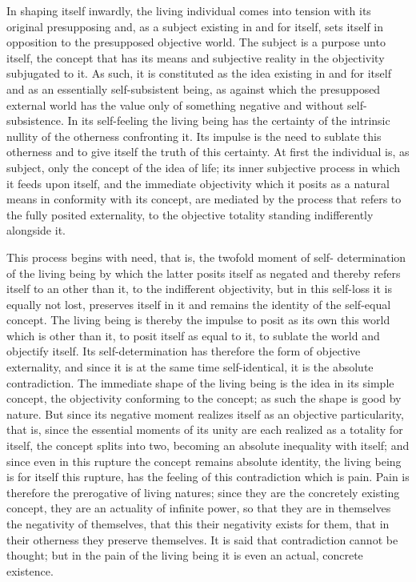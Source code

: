 In shaping itself inwardly, the living individual comes into tension with
its original presupposing and, as a subject existing in and for itself, sets
itself in opposition to the presupposed objective world. The subject is a
purpose unto itself, the concept that has its means and subjective reality
in the objectivity subjugated to it. As such, it is constituted as the idea
existing in and for itself and as an essentially self-subsistent being, as against
which the presupposed external world has the value only of something
negative and without self-subsistence. In its self-feeling the living being
has the certainty of the intrinsic nullity of the otherness confronting it. Its
impulse is the need to sublate this otherness and to give itself the truth
of this certainty. At first the individual is, as subject, only the concept
of the idea of life; its inner subjective process in which it feeds upon
itself, and the immediate objectivity which it posits as a natural means
in conformity with its concept, are mediated by the process that refers to
the fully posited externality, to the objective totality standing indifferently
alongside it.

This process begins with need, that is, the twofold moment of self-
determination of the living being by which the latter posits itself as negated
and thereby refers itself to an other than it, to the indifferent objectivity, but
in this self-loss it is equally not lost, preserves itself in it and remains the
identity of the self-equal concept. The living being is thereby the impulse
to posit as its own this world which is other than it, to posit itself as equal
to it, to sublate the world and objectify itself. Its self-determination has
therefore the form of objective externality, and since it is at the same time
self-identical, it is the absolute contradiction. The immediate shape of the
living being is the idea in its simple concept, the objectivity conforming
to the concept; as such the shape is good by nature. But since its negative
moment realizes itself as an objective particularity, that is, since the essential
moments of its unity are each realized as a totality for itself, the concept
splits into two, becoming an absolute inequality with itself; and since even
in this rupture the concept remains absolute identity, the living being is for
itself this rupture, has the feeling of this contradiction which is pain. Pain
is therefore the prerogative of living natures; since they are the concretely
existing concept, they are an actuality of infinite power, so that they are
in themselves the negativity of themselves, that this their negativity exists
for them, that in their otherness they preserve themselves.
 It is said that
contradiction cannot be thought; but in the pain of the living being it is
even an actual, concrete existence.

